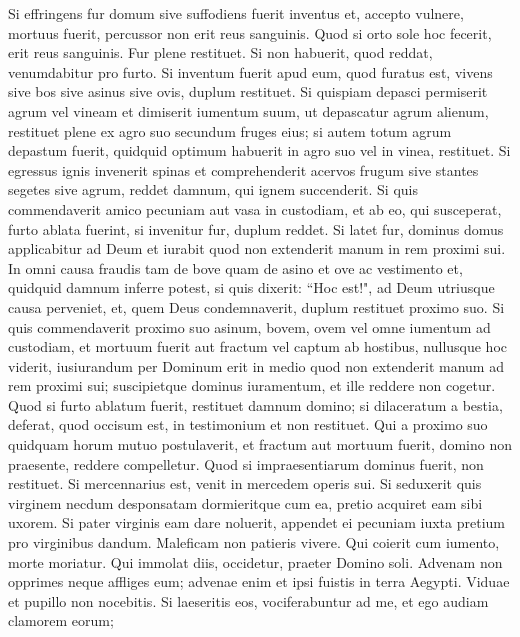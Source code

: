 \begin{biblechapter}  
\verse Si effringens fur domum sive suffodiens fuerit inventus et, accepto vulnere, mortuus fuerit, percussor non erit reus sanguinis. 
\verse Quod si orto sole hoc fecerit, erit reus sanguinis. Fur plene restituet. Si non habuerit, quod reddat, venumdabitur pro furto. 
\verse Si inventum fuerit apud eum, quod furatus est, vivens sive bos sive asinus sive ovis, duplum restituet. 
\verse Si quispiam depasci permiserit agrum vel vineam et dimiserit iumentum suum, ut depascatur agrum alienum, restituet plene ex agro suo secundum fruges eius; si autem totum agrum depastum fuerit, quidquid optimum habuerit in agro suo vel in vinea, restituet. 
\verse Si egressus ignis invenerit spinas et comprehenderit acervos frugum sive stantes segetes sive agrum, reddet damnum, qui ignem succenderit. 
\verse Si quis commendaverit amico pecuniam aut vasa in custodiam, et ab eo, qui susceperat, furto ablata fuerint, si invenitur fur, duplum reddet. 
\verse Si latet fur, dominus domus applicabitur ad Deum et iurabit quod non extenderit manum in rem proximi sui. 
\verse In omni causa fraudis tam de bove quam de asino et ove ac vestimento et, quidquid damnum inferre potest, si quis dixerit: “Hoc est!", ad Deum utriusque causa perveniet, et, quem Deus condemnaverit, duplum restituet proximo suo. 
\verse Si quis commendaverit proximo suo asinum, bovem, ovem vel omne iumentum ad custodiam, et mortuum fuerit aut fractum vel captum ab hostibus, nullusque hoc viderit, 
\verse iusiurandum per Dominum erit in medio quod non extenderit manum ad rem proximi sui; suscipietque dominus iuramentum, et ille reddere non cogetur. 
\verse Quod si furto ablatum fuerit, restituet damnum domino; 
\verse si dilaceratum a bestia, deferat, quod occisum est, in testimonium et non restituet. 
\verse Qui a proximo suo quidquam horum mutuo postulaverit, et fractum aut mortuum fuerit, domino non praesente, reddere compelletur. 
\verse Quod si impraesentiarum dominus fuerit, non restituet. Si mercennarius est, venit in mercedem operis sui. 
\verse Si seduxerit quis virginem necdum desponsatam dormieritque cum ea, pretio acquiret eam sibi uxorem. 
\verse Si pater virginis eam dare noluerit, appendet ei pecuniam iuxta pretium pro virginibus dandum. 
\verse Maleficam non patieris vivere. 
\verse Qui coierit cum iumento, morte moriatur. 
\verse Qui immolat diis, occidetur, praeter Domino soli. 
\verse Advenam non opprimes neque affliges eum; advenae enim et ipsi fuistis in terra Aegypti. 
\verse Viduae et pupillo non nocebitis. 
\verse Si laeseritis eos, vociferabuntur ad me, et ego audiam clamorem eorum; 

\end{biblechapter}
